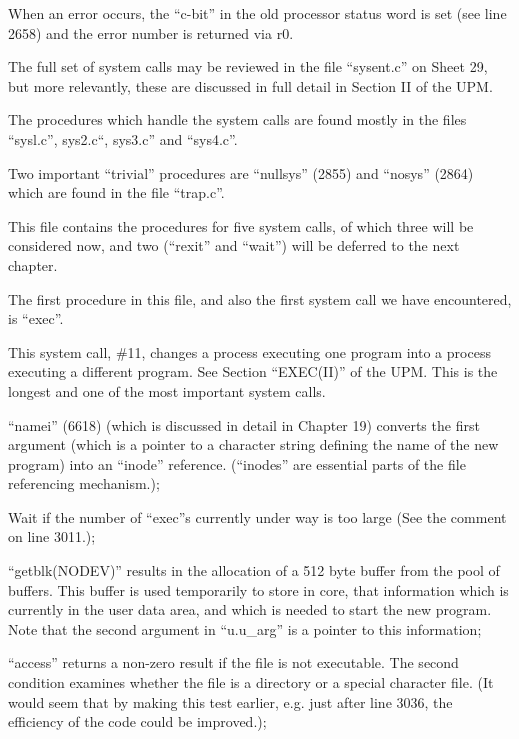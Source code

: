 \item[2776:] When an error occurs, the ``c-bit''
in the old processor status word
is set (see line 2658) and the
error number is returned via r0.
\ed


The full set of system calls may be
reviewed in the file ``sysent.c'' on
Sheet 29, but more relevantly, these
are discussed in full detail in Section
II of the UPM.

The procedures which handle the system
calls are found mostly in the files
``sysl.c'', sys2.c``, sys3.c'' and
``sys4.c''.

Two important ``trivial'' procedures are
``nullsys'' (2855) and ``nosys'' (2864)
which are found in the file ``trap.c''.



This file contains the procedures for
five system calls, of which three will
be considered now, and two (``rexit'' and
``wait'') will be deferred to the next
chapter.

The first procedure in this file, and 
also the first system call we have
encountered, is ``exec''.


This system call, \#11, changes a process executing
one program into a process executing a different program.
See Section ``EXEC(II)'' of the UPM.
This is the longest and one of the most
important system calls.

\bd
\item[3034:] ``namei'' (6618) (which is discussed in detail in Chapter 19)
converts the first argument
(which is a pointer to a character
 string defining the name of 
 the new program) into an ``inode''
 reference. (``inodes'' are essential parts of the file
 referencing mechanism.);

\item[3037:] Wait if the number of ``exec''s
 currently under way is too large
 (See the comment on line 3011.);

\item[3040:] ``getblk(NODEV)'' results in the
 allocation of a 512 byte buffer
 from the pool of buffers. This
 buffer is used temporarily to
 store in core, that information
 which is currently in the user
 data area, and which is needed to
 start the new program. Note that
 the second argument in ``u.u\_arg''
 is a pointer to this information;

\item[3041:] ``access'' returns a non-zero
result if the file is not executable. The second
condition examines whether the file is a
directory or a special character file.
(It would seem that by making
this test earlier, e.g. just
after line 3036, the efficiency
of the code could be improved.);

